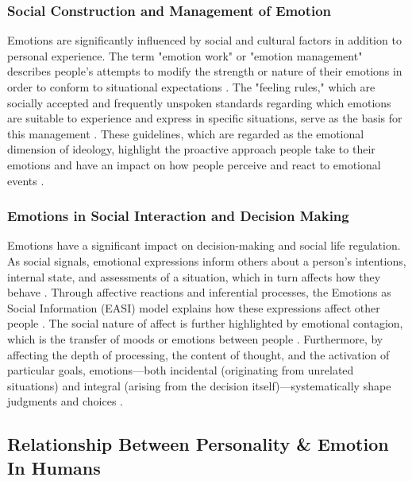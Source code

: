 \documentclass{DESSThesis}
\begin{document}
\subsubsection{Social Construction and Management of Emotion}
Emotions are significantly influenced by social and cultural factors in addition to personal experience. The term "emotion work" or "emotion management" describes people's attempts to modify the strength or nature of their emotions in order to conform to situational expectations \cite{hochschild_emotion_1979}. The "feeling rules," which are socially accepted and frequently unspoken standards regarding which emotions are suitable to experience and express in specific situations, serve as the basis for this management \cite{hochschild_emotion_1979}. These guidelines, which are regarded as the emotional dimension of ideology, highlight the proactive approach people take to their emotions and have an impact on how people perceive and react to emotional events \cite{hochschild_emotion_1979}.

\subsubsection{Emotions in Social Interaction and Decision Making}
Emotions have a significant impact on decision-making and social life regulation. As social signals, emotional expressions inform others about a person's intentions, internal state, and assessments of a situation, which in turn affects how they behave \cite{van_kleef_how_2009,parkinson_current_2015}. Through affective reactions and inferential processes, the Emotions as Social Information (EASI) model explains how these expressions affect other people \cite{van_kleef_how_2009}. The social nature of affect is further highlighted by emotional contagion, which is the transfer of moods or emotions between people \cite{barsade_ripple_2002}. Furthermore, by affecting the depth of processing, the content of thought, and the activation of particular goals, emotions—both incidental (originating from unrelated situations) and integral (arising from the decision itself)—systematically shape judgments and choices \cite{lerner_emotion_2015}.

\subsection{Relationship Between Personality \& Emotion In Humans}
\end{document}
